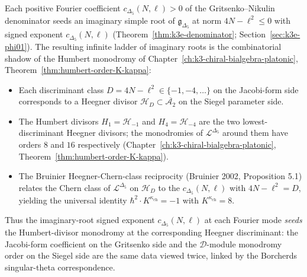 \begin{remark}
\label{rem:k3e-imaginary-root-seeds-humbert}
Each positive Fourier coefficient $c_{\Delta_5}(N,\ell) > 0$ of the Gritsenko--Nikulin
denominator seeds an imaginary simple root of $\mathfrak{g}_{\Delta_5}$ at norm
$4N - \ell^2 \leq 0$ with signed exponent $c_{\Delta_5}(N,\ell)$
(Theorem~\ref{thm:k3e-denominator}; Section~\ref{sec:k3e-phi01}). The resulting
infinite ladder of imaginary roots is the combinatorial shadow of the Humbert
monodromy of Chapter~\ref{ch:k3-chiral-bialgebra-platonic},
Theorem~\ref{thm:humbert-order-K-kappa}:
\begin{itemize}
\item Each discriminant class $D = 4N-\ell^2\in\{-1, -4, \ldots\}$ on the Jacobi-form
 side corresponds to a Heegner divisor $\mathcal{H}_D\subset\overline{\mathcal{A}_2}$
 on the Siegel parameter side.
\item The Humbert divisors $H_1 = \mathcal{H}_{-1}$ and $H_4 = \mathcal{H}_{-4}$ are
 the two lowest-discriminant Heegner divisors; the monodromies of
 $\mathcal{L}^{\Delta_5}$ around them have orders $8$ and $16$ respectively
 (Chapter~\ref{ch:k3-chiral-bialgebra-platonic},
 Theorem~\ref{thm:humbert-order-K-kappa}).
\item The Bruinier Heegner-Chern-class reciprocity (Bruinier 2002, Proposition 5.1)
 relates the Chern class of $\mathcal{L}^{\Delta_5}$ on $\mathcal{H}_D$ to the
 $c_{\Delta_5}(N,\ell)$ with $4N-\ell^2 = D$, yielding the universal identity
 $\hbar^2\cdot K^{\kappa_{\mathrm{ch}}} = -1$ with $K^{\kappa_{\mathrm{ch}}} = 8$.
\end{itemize}
Thus the imaginary-root signed exponent $c_{\Delta_5}(N,\ell)$ at each Fourier mode
\emph{seeds} the Humbert-divisor monodromy at the corresponding Heegner
discriminant: the Jacobi-form coefficient on the Gritsenko side and the
$\mathcal{D}$-module monodromy order on the Siegel side are the same data viewed
twice, linked by the Borcherds singular-theta correspondence.
\end{remark}

